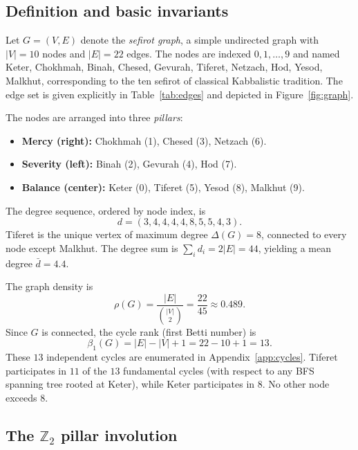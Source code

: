 \documentclass[11pt,a4paper]{amsart}
\theoremstyle{remark}
\newcommand{\bbZ}{\mathbb{Z}}
\begin{document}
\subsection{Definition and basic invariants}
\label{sec:definition}

Let $G = (V, E)$ denote the \emph{sefirot graph}, a simple undirected graph
with $|V| = 10$ nodes and $|E| = 22$ edges. The nodes are indexed
$0, 1, \ldots, 9$ and named Keter, Chokhmah, Binah, Chesed, Gevurah,
Tiferet, Netzach, Hod, Yesod, Malkhut, corresponding to the ten sefirot of
classical Kabbalistic tradition. The edge set is given explicitly in
Table~\ref{tab:edges} and depicted in Figure~\ref{fig:graph}.

The nodes are arranged into three \emph{pillars}:
\begin{itemize}
  \item \textbf{Mercy (right):} Chokhmah (1), Chesed (3), Netzach (6).
  \item \textbf{Severity (left):} Binah (2), Gevurah (4), Hod (7).
  \item \textbf{Balance (center):} Keter (0), Tiferet (5), Yesod (8), Malkhut (9).
\end{itemize}

The degree sequence, ordered by node index, is
\begin{equation}
d = (3, 4, 4, 4, 4, 8, 5, 5, 4, 3).
\end{equation}
Tiferet is the unique vertex of maximum degree $\Delta(G) = 8$, connected to
every node except Malkhut. The degree sum is $\sum_i d_i = 2|E| = 44$,
yielding a mean degree $\bar{d} = 4.4$.

The graph density is
\begin{equation}
\rho(G) = \frac{|E|}{\binom{|V|}{2}} = \frac{22}{45} \approx 0.489.
\end{equation}
Since $G$ is connected, the cycle rank (first Betti number) is
\begin{equation}
\beta_1(G) = |E| - |V| + 1 = 22 - 10 + 1 = 13.
\end{equation}
These $13$ independent cycles are enumerated in Appendix~\ref{app:cycles}.
Tiferet participates in $11$ of the $13$ fundamental cycles (with respect to
any BFS spanning tree rooted at Keter), while Keter participates in $8$.
No other node exceeds $8$.

\subsection{The $\bbZ_2$ pillar involution}
\label{sec:pillar-involution}
\end{document}
